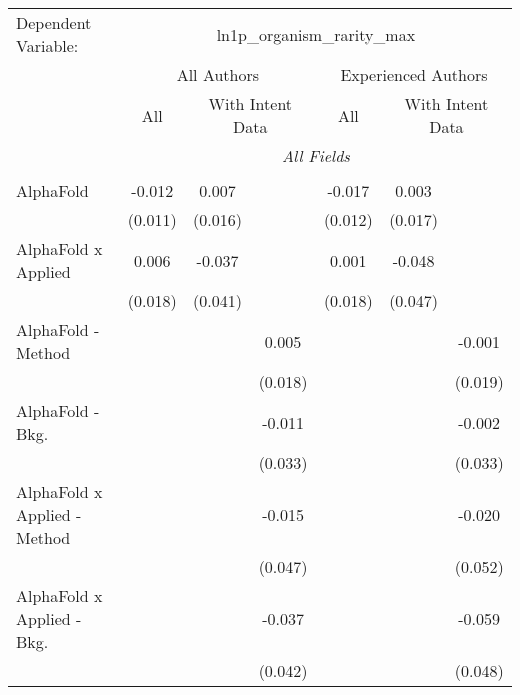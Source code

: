 \begingroup
\centering
\begin{tabular}{lcccccc}
   \tabularnewline \midrule \midrule
   Dependent Variable: & \multicolumn{6}{c}{ln1p\_organism\_rarity\_max}\\
 & \multicolumn{3}{c}{All Authors} & \multicolumn{3}{c}{Experienced Authors} \\
\cmidrule(lr){2-4} \cmidrule(lr){5-7}
 & \multicolumn{1}{c}{All} & \multicolumn{2}{c}{With Intent Data} & \multicolumn{1}{c}{All} & \multicolumn{2}{c}{With Intent Data} \\
\cmidrule(lr){2-2} \cmidrule(lr){3-4} \cmidrule(lr){5-5} \cmidrule(lr){6-7}
 & \multicolumn{6}{c}{\textit{All Fields}} \\ \\
   AlphaFold                      & -0.012       & 0.007        &                & -0.017       & 0.003        &   \\   
                                  & (0.011)      & (0.016)      &                & (0.012)      & (0.017)      &   \\   
   AlphaFold x Applied            & 0.006        & -0.037       &                & 0.001        & -0.048       &   \\   
                                  & (0.018)      & (0.041)      &                & (0.018)      & (0.047)      &   \\   
   AlphaFold - Method             &              &              & 0.005          &              &              & -0.001\\   
                                  &              &              & (0.018)        &              &              & (0.019)\\   
   AlphaFold - Bkg.               &              &              & -0.011         &              &              & -0.002\\   
                                  &              &              & (0.033)        &              &              & (0.033)\\   
   AlphaFold x Applied - Method   &              &              & -0.015         &              &              & -0.020\\   
                                  &              &              & (0.047)        &              &              & (0.052)\\   
   AlphaFold x Applied - Bkg.     &              &              & -0.037         &              &              & -0.059\\   
                                  &              &              & (0.042)        &              &              & (0.048)\\   

\end{tabular}
